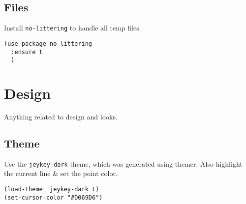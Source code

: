 \documentclass[11pt]{article}
\begin{document}
\subsection{Files}
\label{sec:org37fe153}
Install \texttt{no-littering} to handle all temp files.
\begin{verbatim}
(use-package no-littering
  :ensure t
  )
\end{verbatim}
\section{Design}
\label{sec:orgace4b48}
Anything related to design and looks.
\subsection{Theme}
\label{sec:orga84754b}
Use the \texttt{jeykey-dark} theme, which was generated using themer. Also
highlight the current line \& set the point color.
\begin{verbatim}
(load-theme 'jeykey-dark t)
(set-cursor-color "#D069D6")
\end{verbatim}
\end{document}
